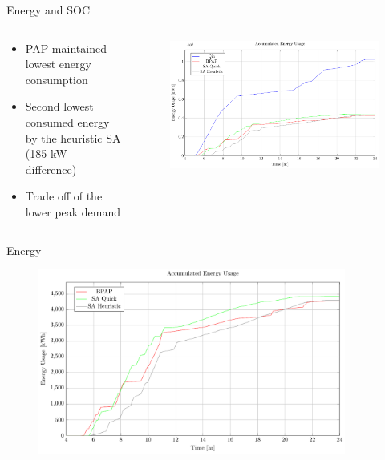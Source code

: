 \documentclass[aspectratio=169]{beamer}
\begin{document}
\begin{frame}[label={sec:orgb4b61cc}]{Energy and SOC}
\begin{columns}
\begin{column}{0.3\columnwidth}
\begin{itemize}
\item PAP maintained lowest energy consumption
\item Second lowest consumed energy by the heuristic SA (\alert{185} kW difference)
\item Trade off of the lower peak demand
\end{itemize}
\end{column}

\begin{column}{0.7\columnwidth}
\begin{figure}[htpb]
\centering
    \includegraphics[width=\textwidth]{img/sa-pap-paper-good/energy}
\end{figure}
\end{column}
\end{columns}
\end{frame}

\begin{frame}[label={sec:org80d545b}]{Energy}
\begin{figure}[htpb]
\centering
    \includegraphics[width=0.9\textwidth]{img/sa-pap-paper-good/energy-zoom}
\end{figure}
\end{frame}
\end{document}
